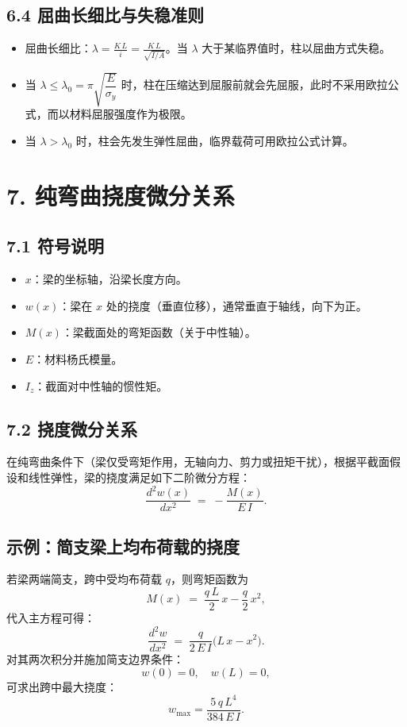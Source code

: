 \documentclass[12pt,a4paper]{article}
\begin{document}
\subsection*{6.4 屈曲长细比与失稳准则}
\begin{itemize}
  \item 屈曲长细比：$\displaystyle \lambda = \frac{K\,L}{i} = \frac{K\,L}{\sqrt{I/A}}$。当 $\lambda$ 大于某临界值时，柱以屈曲方式失稳。
  \item 当 $\lambda \le \lambda_0 = \pi \sqrt{\dfrac{E}{\sigma_y}}$ 时，柱在压缩达到屈服前就会先屈服，此时不采用欧拉公式，而以材料屈服强度作为极限。
  \item 当 $\lambda > \lambda_0$ 时，柱会先发生弹性屈曲，临界载荷可用欧拉公式计算。
\end{itemize}

\section*{7.  纯弯曲挠度微分关系}

\subsection*{7.1 符号说明}
\begin{itemize}
  \item $x$：梁的坐标轴，沿梁长度方向。
  \item $w(x)$：梁在 $x$ 处的挠度（垂直位移），通常垂直于轴线，向下为正。
  \item $M(x)$：梁截面处的弯矩函数（关于中性轴）。
  \item $E$：材料杨氏模量。
  \item $I_z$：截面对中性轴的惯性矩。
\end{itemize}

\subsection*{7.2 挠度微分关系}
在纯弯曲条件下（梁仅受弯矩作用，无轴向力、剪力或扭矩干扰），根据平截面假设和线性弹性，梁的挠度满足如下二阶微分方程：
\[
  \frac{d^2 w(x)}{d x^2}
  \;=\;
  -\frac{M(x)}{E\,I}.
\]

\subsection*{示例：简支梁上均布荷载的挠度}
若梁两端简支，跨中受均布荷载 $q$，则弯矩函数为
\[
  M(x) \;=\; \frac{q\,L}{2}\,x - \frac{q}{2}\,x^2,
\]
代入主方程可得：
\[
  \frac{d^2 w}{dx^2}
  \;=\;
  \frac{q}{2\,E\,I} \bigl(L\,x - x^2\bigr).
\]
对其两次积分并施加简支边界条件：
\[
  w(0) = 0,\quad w(L) = 0,
\]
可求出跨中最大挠度：
\[
  w_{\max} = \frac{5\,q\,L^4}{384\,E\,I}.
\]
\end{document}
